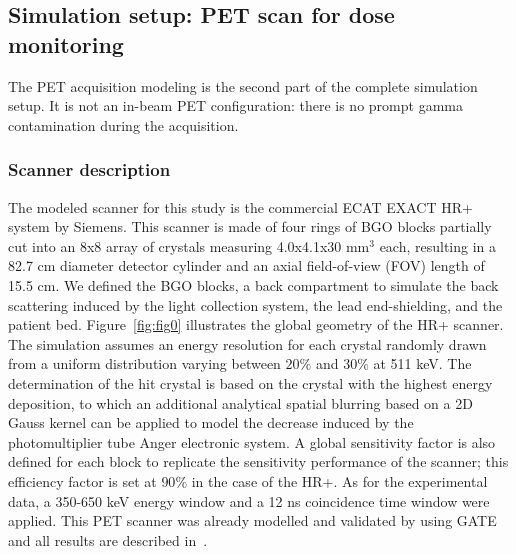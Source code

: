 \documentclass[11pt]{iopart}
\begin{document}


\subsection{Simulation setup: PET scan for dose monitoring}

The PET acquisition modeling is the second part of the complete
simulation setup. It is not an in-beam PET configuration: there is no
prompt gamma contamination during the acquisition.

\subsubsection{Scanner description}

The modeled scanner for this study is the commercial ECAT EXACT
HR+~\cite{Brix1997} system by Siemens. This scanner is made of four
rings of BGO blocks partially cut into an 8x8 array of crystals
measuring 4.0x4.1x30 mm$^3$ each, resulting in a 82.7 cm diameter
detector cylinder and an axial field-of-view (FOV) length of 15.5
cm. We defined the BGO blocks, a back compartment to simulate the back
scattering induced by the light collection system, the lead
end-shielding, and the patient bed. Figure~\ref{fig:fig0} illustrates
the global geometry of the HR+ scanner. The simulation assumes an
energy resolution for each crystal randomly drawn from a uniform
distribution varying between $20 \%$ and $30 \%$ at 511 keV. The
determination of the hit crystal is based on the crystal with the
highest energy deposition, to which an additional analytical spatial
blurring based on a 2D Gauss kernel can be applied to model the
decrease induced by the photomultiplier tube Anger electronic
system. A global sensitivity factor is also defined for each block to
replicate the sensitivity performance of the scanner; this efficiency
factor is set at $90 \%$ in the case of the HR+. As for the
experimental data, a 350-650 keV energy window and a 12 ns coincidence
time window were applied. This PET scanner was already modelled and
validated by using GATE and all results are described
in~\cite{Jan2005}.
\end{document}
